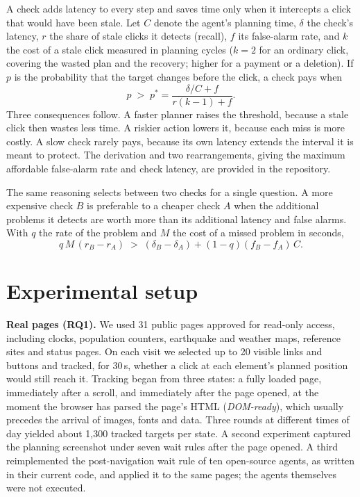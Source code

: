 \documentclass[10pt]{article}
\begin{document}
A check adds latency to every step and saves time only when it intercepts a click that would have been stale. Let $C$ denote the agent's planning time, $\delta$ the check's latency, $r$ the share of stale clicks it detects (recall), $f$ its false-alarm rate, and $k$ the cost of a stale click measured in planning cycles ($k=2$ for an ordinary click, covering the wasted plan and the recovery; higher for a payment or a deletion). If $p$ is the probability that the target changes before the click, a check pays when
\begin{equation}
p \;>\; p^{*} = \frac{\delta/C+f}{r(k-1)+f}.
\label{eq:breakeven}
\end{equation}
Three consequences follow. A faster planner raises the threshold, because a stale click then wastes less time. A riskier action lowers it, because each miss is more costly. A slow check rarely pays, because its own latency extends the interval it is meant to protect. The derivation and two rearrangements, giving the maximum affordable false-alarm rate and check latency, are provided in the repository.

The same reasoning selects between two checks for a single question. A more expensive check $B$ is preferable to a cheaper check $A$ when the additional problems it detects are worth more than its additional latency and false alarms. With $q$ the rate of the problem and $M$ the cost of a missed problem in seconds,
\begin{equation}
q\,M\,(r_B-r_A) \;>\; (\delta_B-\delta_A)+(1-q)(f_B-f_A)\,C .
\label{eq:rubric}
\end{equation}

\section{Experimental setup}
\label{sec:method}

\textbf{Real pages (RQ1).} We used 31 public pages approved for read-only access, including clocks, population counters, earthquake and weather maps, reference sites and status pages. On each visit we selected up to 20 visible links and buttons and tracked, for 30\,s, whether a click at each element's planned position would still reach it. Tracking began from three states: a fully loaded page, immediately after a scroll, and immediately after the page opened, at the moment the browser has parsed the page's HTML (\emph{DOM-ready}), which usually precedes the arrival of images, fonts and data. Three rounds at different times of day yielded about 1,300 tracked targets per state. A second experiment captured the planning screenshot under seven wait rules after the page opened. A third reimplemented the post-navigation wait rule of ten open-source agents, as written in their current code, and applied it to the same pages; the agents themselves were not executed.
\end{document}
